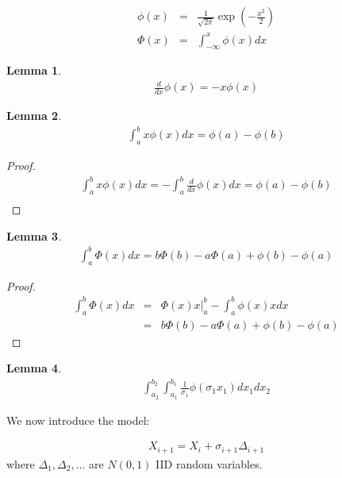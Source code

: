\documentclass{article}
\newtheorem{lemma}{Lemma}
\begin{document}
\begin{eqnarray*}
  \phi(x) & = & \frac{1}{\sqrt{2\pi}}\exp\left(-\frac{x^2}{2}\right)\\
  \Phi(x) & = & \int_{-\infty}^x \phi(x) d\!x
\end{eqnarray*}

\begin{lemma}
  \begin{eqnarray*}
    \frac{d}{d\!x}\phi(x) = -x \phi(x)
  \end{eqnarray*}
\end{lemma}

\begin{lemma}
  \begin{eqnarray*}
    \int_a^b x\phi(x)d\!x = \phi(a) - \phi(b)
  \end{eqnarray*}
\end{lemma}
\begin{proof}
  \begin{eqnarray*}
    \int_a^b x\phi(x)d\!x = -\int_a^b \frac{d}{d\!x}\phi(x)d\!x = \phi(a) - \phi(b)\\
  \end{eqnarray*}
\end{proof}

\begin{lemma}
  \begin{eqnarray*}
    \int_a^b \Phi(x) d\!x = b \Phi(b) - a \Phi(a) + \phi(b) - \phi(a)
  \end{eqnarray*}
\end{lemma}
\begin{proof}
  \begin{eqnarray*}
    \int_a^b \Phi(x) d\!x & = & \left.\Phi(x) x\right\vert_a^b - \int_a^b \phi(x) x d\!x\\
    & = & b \Phi(b) - a \Phi(a) + \phi(b) - \phi(a)
  \end{eqnarray*}
\end{proof}

\begin{lemma}
  \begin{eqnarray*}
    \int_{a_2}^{b_2}\int_{a_1}^{b_1} \frac{1}{\sigma_1}\phi\left( \sigma_1 x_1 \right)d\!x_1 d\!x_2
  \end{eqnarray*}
\end{lemma}

We now introduce the model:

\begin{eqnarray*}
  X_{i+1} = X_i + \sigma_{i+1} \Delta_{i+1}
\end{eqnarray*}
%
where $\Delta_1, \Delta_2, \ldots$ are $N(0,1)$ IID random variables.
\end{document}
